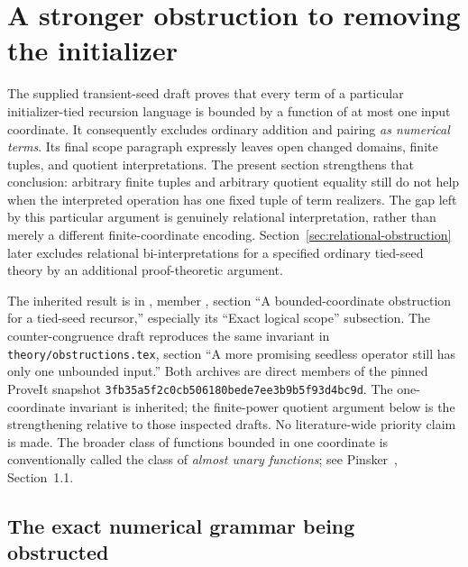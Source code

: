 
\section{A stronger obstruction to removing the initializer}
\label{sec:finite-dimensional-obstruction}

The supplied transient-seed draft proves that every term of a particular
initializer-tied recursion language is bounded by a function of at most
one input coordinate. It consequently excludes ordinary addition and
pairing \emph{as numerical terms}. Its final scope paragraph expressly
leaves open changed domains, finite tuples, and quotient interpretations.
The present section strengthens that conclusion: arbitrary finite tuples
and arbitrary quotient equality still do not help when the interpreted
operation has one fixed tuple of term realizers. The gap left by this
particular argument is genuinely relational interpretation, rather than
merely a different finite-coordinate encoding.
Section~\ref{sec:relational-obstruction} later excludes relational
bi-interpretations for a specified ordinary tied-seed theory by an
additional proof-theoretic argument.

The inherited result is in
,
member , section
``A bounded-coordinate obstruction for a tied-seed recursor,'' especially
its ``Exact logical scope'' subsection. The counter-congruence draft
reproduces the same invariant in
\texttt{theory/obstructions.tex}, section
``A more promising seedless operator still has only one unbounded input.''
Both archives are direct members of the pinned ProveIt snapshot
\texttt{3fb35a5f2c0cb506180bede7ee3b9b5f93d4bc9d}.
The one-coordinate invariant is inherited; the finite-power quotient
argument below is the strengthening relative to those inspected drafts.
No literature-wide priority claim is made. The broader class of functions
bounded in one coordinate is conventionally called the class of
\emph{almost unary functions}; see Pinsker~\cite{pinsker-almost-unary},
Section~1.1.

\subsection{The exact numerical grammar being obstructed}

